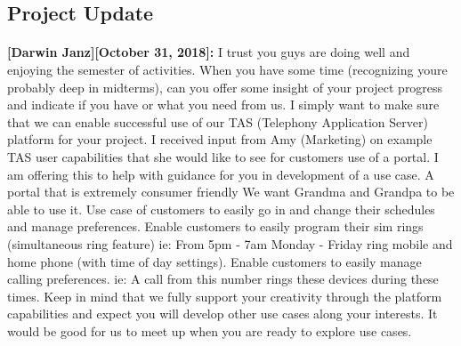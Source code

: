 \documentclass[12pt]{article}
\begin{document}
\subsection{Project Update}

\paragraph{}
\textbf{[Darwin Janz][October 31, 2018]:} I trust you guys are doing well and enjoying the semester of activities.  When you have some time (recognizing youre probably deep in midterms), can you offer some insight of your project progress and indicate if you have or what you need from us.  I simply want to make sure that we can enable successful use of our TAS (Telephony Application Server) platform for your project. I received input from Amy (Marketing) on example TAS user capabilities that she would like to see for customers use of a portal.  I am offering this to help with guidance for you in development of a use case. A portal that is extremely consumer friendly We want Grandma and Grandpa to be able to use it. Use case of customers to easily go in and change their schedules and manage preferences. Enable customers to easily program their sim rings (simultaneous ring feature) ie:  From 5pm - 7am Monday - Friday ring mobile and home phone (with time of day settings). Enable customers to easily manage calling preferences. ie:  A call from this number rings these devices during these times. Keep in mind that we fully support your creativity through the platform capabilities and expect you will develop other use cases along your interests. It would be good for us to meet up when you are ready to explore use cases.
\end{document}
